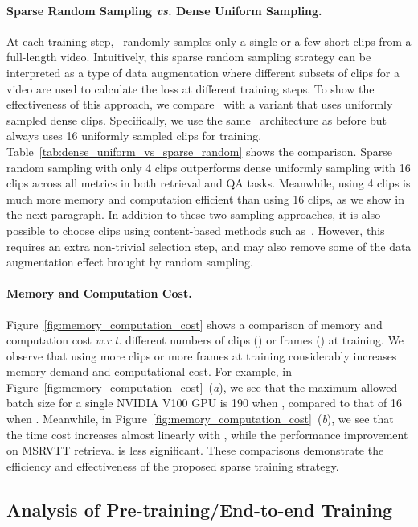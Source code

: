 \paragraph{Sparse Random Sampling \textit{vs.} Dense Uniform Sampling.} 
At each training step, \ModelName~randomly samples only a single or a few short clips from a full-length video.
Intuitively, this sparse random sampling strategy can be interpreted as a type of data augmentation where different subsets of clips for a video are used to calculate the loss at different training steps.
To show the effectiveness of this approach, we compare \ModelName~with a variant that uses uniformly sampled dense clips.
Specifically, we use the same \ModelName~architecture as before but always uses 16 uniformly sampled clips for training.
Table~\ref{tab:dense_uniform_vs_sparse_random} shows the comparison. 
Sparse random sampling with only 4 clips outperforms dense uniformly sampling with 16 clips across all metrics in both retrieval and QA tasks.
Meanwhile, using 4 clips is much more memory and computation efficient than using 16 clips, as we show in the next paragraph.
In addition to these two sampling approaches, it is also possible to choose clips using content-based methods such as~\cite{wu2019adaframe}. 
However, this requires an extra non-trivial selection step, and may also remove some of the data augmentation effect brought by random sampling.



\paragraph{Memory and Computation Cost.} 
Figure~\ref{fig:memory_computation_cost} shows a comparison of memory and computation cost \emph{w.r.t.} different numbers of clips () or frames () at training. 
We observe that using more clips or more frames at training considerably increases memory demand and computational cost.
For example, in Figure~\ref{fig:memory_computation_cost}~(\textit{a}), we see that the maximum allowed batch size for a single NVIDIA V100 GPU is 190 when , compared to that of 16 when .
Meanwhile, in Figure~\ref{fig:memory_computation_cost}~(\textit{b}), we see that the time cost increases almost linearly with , while the performance improvement on MSRVTT retrieval is less significant.
These comparisons demonstrate the efficiency and effectiveness of the proposed sparse training strategy.


\subsection{Analysis of Pre-training/End-to-end Training}\label{subsec:analysis_pretraining_and_e2e_training}




